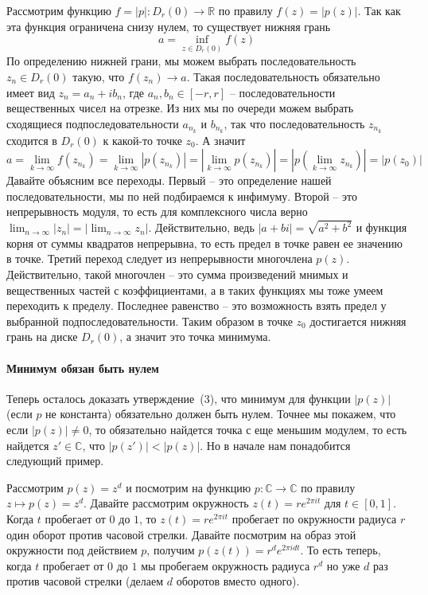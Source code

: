 Рассмотрим функцию $f = |p|\colon D_r(0)\to \mathbb R$ по правилу $f(z) = |p(z)|$.
Так как эта функция ограничена снизу нулем, то существует нижняя грань
\[
a = \inf_{z\in D_r(0)} f(z)
\]
По определению нижней грани, мы можем выбрать последовательность $z_n\in D_r(0)$ такую, что $f(z_n) \to a$.
Такая последовательность обязательно имеет вид $z_n = a_n + i b_n$, где $a_n, b_n\in [-r, r]$ -- последовательности вещественных чисел на отрезке.
Из них мы по очереди можем выбрать сходящиеся подпоследовательности $a_{n_k}$ и $b_{n_k}$, так что последовательность $z_{n_k}$ сходится в $D_r(0)$ к какой-то точке $z_0$.
А значит
\[
a = \lim_{k\to \infty} f(z_{n_k}) = \lim_{k\to \infty} |p(z_{n_k})| = \left|\lim_{k\to \infty} p(z_{n_k})\right| = \left|p\left(\lim_{k\to \infty} z_{n_k}\right)\right| = |p(z_0)|
\]
Давайте объясним все переходы.
Первый -- это определение нашей последовательности, мы по ней подбираемся к инфимуму.
Второй -- это непрерывность модуля, то есть для комплексного числа верно $\lim_{n\to \infty}|z_n| = |\lim_{n\to \infty} z_n|$.
Действительно, ведь $|a + bi| = \sqrt{a^2 + b^2}$ и функция корня от суммы квадратов непрерывна, то есть предел в точке равен ее значению в точке.
Третий переход следует из непрерывности многочлена $p(z)$.
Действительно, такой многочлен -- это сумма произведений мнимых и вещественных частей с коэффициентами, а в таких функциях мы тоже умеем переходить к пределу.
Последнее равенство -- это возможность взять предел у выбранной подпоследовательности.
Таким образом в точке $z_0$ достигается нижняя грань на диске $D_r(0)$, а значит это точка минимума.


\paragraph{Минимум обязан быть нулем}

Теперь осталось доказать утверждение~(3), что минимум для функции $|p(z)|$ (если $p$ не константа) обязательно должен быть нулем.
Точнее мы покажем, что если $|p(z)|\neq 0$, то обязательно найдется точка с еще меньшим модулем, то есть найдется $z'\in \mathbb C$, что $|p(z')|< |p(z)|$.
Но в начале нам понадобится следующий пример.

\begin{example}
[V.I.P. пример]
Рассмотрим $p(z) = z^d$ и посмотрим на функцию $p\colon \mathbb C\to \mathbb C$ по правилу $z \mapsto p(z) = z^d$.
Давайте рассмотрим окружность $z(t) = r e^{2\pi i t}$ для $t\in [0, 1]$.
Когда $t$ пробегает от $0$ до $1$, то $z(t) = r e^{2\pi i t}$ пробегает по окружности радиуса $r$ один оборот против часовой стрелки.
Давайте посмотрим на образ этой окружности под действием $p$, получим $p(z(t)) = r^d e^{2\pi i d t}$.
То есть теперь, когда $t$ пробегает от $0$ до $1$ мы пробегаем окружность радиуса $r^d$ но уже $d$ раз против часовой стрелки (делаем $d$ оборотов вместо одного).
\end{example}


